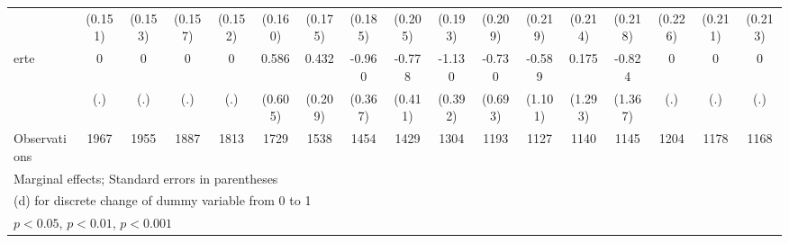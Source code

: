 {\begin{tabular}{l*{16}{c}}
                    &     (0.151)         &     (0.153)         &     (0.157)         &     (0.152)         &     (0.160)         &     (0.175)         &     (0.185)         &     (0.205)         &     (0.193)         &     (0.209)         &     (0.219)         &     (0.214)         &     (0.218)         &     (0.226)         &     (0.211)         &     (0.213)         \\
[1em]
erte                &           0         &           0         &           0         &           0         &       0.586         &       0.432\sym{*}  &      -0.960\sym{**} &      -0.778         &      -1.130\sym{**} &      -0.730         &      -0.589         &       0.175         &      -0.824         &           0         &           0         &           0         \\
                    &         (.)         &         (.)         &         (.)         &         (.)         &     (0.605)         &     (0.209)         &     (0.367)         &     (0.411)         &     (0.392)         &     (0.693)         &     (1.101)         &     (1.293)         &     (1.367)         &         (.)         &         (.)         &         (.)         \\
\hline
Observations        &        1967         &        1955         &        1887         &        1813         &        1729         &        1538         &        1454         &        1429         &        1304         &        1193         &        1127         &        1140         &        1145         &        1204         &        1178         &        1168         \\
\hline\hline
\multicolumn{17}{l}{\footnotesize Marginal effects; Standard errors in parentheses}\\
\multicolumn{17}{l}{\footnotesize  (d) for discrete change of dummy variable from 0 to 1}\\
\multicolumn{17}{l}{\footnotesize \sym{*} \(p<0.05\), \sym{**} \(p<0.01\), \sym{***} \(p<0.001\)}\\
\end{tabular}
}

